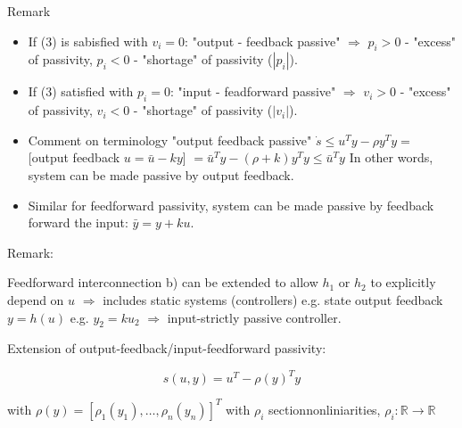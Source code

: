 Remark
\begin{itemize}
 \item If (3) is sabisfied with $v_i=0$: "output - feedback passive" $\Rightarrow$ $p_i>0$
  -  "excess" of passivity, $p_i<0$ - "shortage" of passivity ($|p_i|$).
 \item If (3) satisfied with $p_i=0$: "input - feadforward passive" $\Rightarrow$ $v_i>0$
  -  "excess" of passivity, $v_i<0$ - "shortage" of passivity ($|v_i|$).
 \item Comment on terminology "output feedback passive" 
  $\dot s \le u^Ty-\rho y^Ty =$ [output feedback $u=\bar u -ky$] 
  $=\bar u^T y - (\rho+k)y^T y \le \bar u^Ty$ In other words, system can be made passive
  by output feedback.
 \item Similar for feedforward passivity, system can be made passive by feedback forward
  the input: $\bar y = y + ku$.
\end{itemize}

Remark:

Feedforward interconnection b) can be extended to allow $h_1$ or $h_2$ to explicitly depend
on $u$ $\Rightarrow$ includes static systems (controllers) e.g. state output feedback $y=h(u)$
e.g. $y_2=ku_2$ $\Rightarrow$ input-strictly passive controller.

Extension of output-feedback/input-feedforward passivity:

$$s(u,y)=u^T-\rho(y)^Ty$$

with $\rho(y) = [\rho_1(y_1),\dots,\rho_n(y_n)]^T$ with $\rho_i$ sectionnonliniarities, 
$\rho_i: \mathbb{R}\rightarrow\mathbb{R}$

